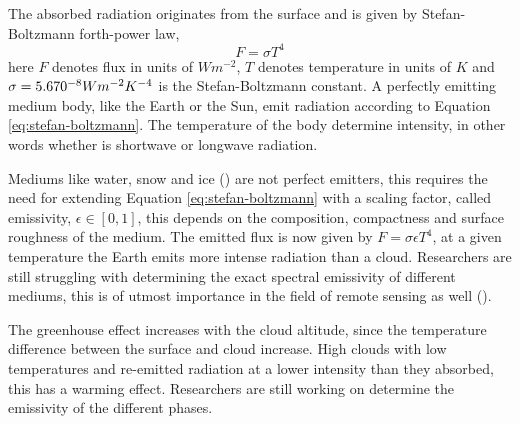 The absorbed radiation originates from the surface and is given by Stefan-Boltzmann forth-power law, 
\begin{equation} \label{eq:stefan-boltzmann}
    F = \sigma  T ^4 %
\end{equation}
here $F$ denotes flux in units of $W m^{-2}$, $T$ denotes temperature in units of $K$ and $\sigma = 5.670 \time 10^{-8} W m^{-2} K^{-4}$ is the Stefan-Boltzmann constant.
A perfectly emitting medium body, like the Earth or the Sun, emit radiation according to Equation \eqref{eq:stefan-boltzmann}. The temperature of the body determine intensity, in other words whether is shortwave or longwave radiation.

Mediums like water, snow and ice (\cite{Huang2018ImprovedClimate}) are not perfect emitters, this requires the need for extending Equation \eqref{eq:stefan-boltzmann} with a scaling factor, called emissivity, $\epsilon \in [0, 1]$, this depends on the composition, compactness and surface roughness of the medium. The emitted flux is now given by $ F = \sigma \epsilon T ^4$, at a given temperature the Earth emits more intense radiation than a cloud. Researchers are still struggling with determining the exact spectral emissivity of different mediums, this is of utmost importance in the field of remote sensing as well (\citeauthor{Huang2016AnSimulations}).

The greenhouse effect increases with the cloud altitude, since the temperature difference between the surface and cloud increase. High clouds with low temperatures and  re-emitted radiation at a lower intensity than they absorbed, this has a warming effect. Researchers are still working on determine the emissivity of the different phases. 




